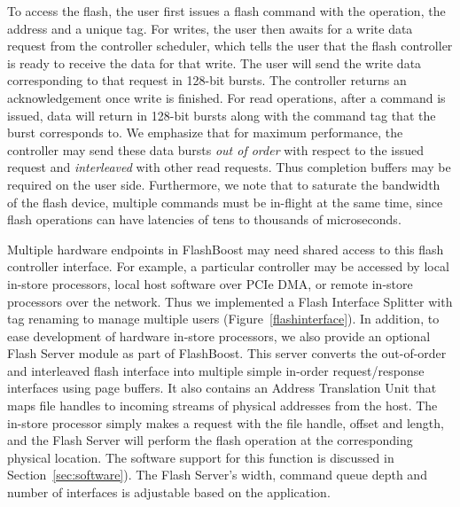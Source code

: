To access the flash, the user first issues a flash command
with the operation, the address and a unique tag.
For writes, the user then awaits for a write data request from
the controller scheduler, which tells the user that the flash controller is
ready to receive the data for that write. The user will send the write data
corresponding to that request in 128-bit bursts. The controller returns an
acknowledgement once write is finished. 
For read operations, after a command is issued,
data will return in 128-bit bursts along with the command tag that the
burst corresponds to. We emphasize that for maximum performance, the
controller may send these data bursts \emph{out of order} with respect to
the issued request and \emph{interleaved} with other read requests.
Thus completion buffers may be required on the user side. Furthermore,
we note that to saturate the bandwidth of the flash device, multiple
commands must be in-flight at the same time, since flash operations
can have latencies of tens to thousands of microseconds. 


Multiple hardware endpoints in FlashBoost may need shared access to this
flash controller interface. For example, a particular controller may
be accessed by local in-store processors, local host software over PCIe
DMA, or remote in-store processors over the network. Thus we implemented a
Flash Interface Splitter with tag renaming to manage multiple users (Figure~\ref{flashinterface}). In addition, 
to ease development of hardware in-store processors,
we also provide an optional Flash Server module as part of FlashBoost. This server
converts the out-of-order and interleaved flash interface into
multiple simple in-order request/response interfaces
using page buffers. It also contains an Address Translation Unit that 
maps file handles to incoming streams of physical addresses from the host. The in-store processor
simply makes a request with the file handle, offset and length, and the Flash Server will perform
the flash operation at the corresponding physical location. The software
support for this function is discussed in Section~\ref{sec:software}). The Flash
Server's width, command queue depth and number of interfaces is adjustable 
based on the application.

